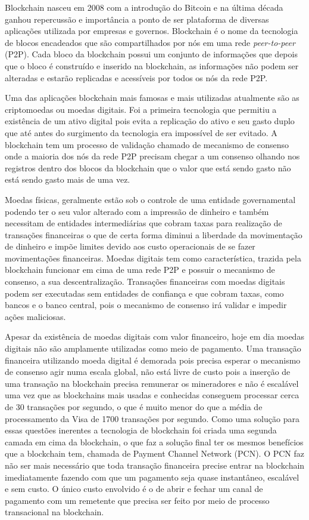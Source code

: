 \documentclass[12pt]{article}
\begin{document}
Blockchain nasceu em 2008 com a introdução do Bitcoin e na última década ganhou repercussão e importância a ponto de ser plataforma de diversas aplicações utilizada por empresas e governos. Blockchain é o nome da tecnologia de blocos encadeados que são compartilhados por nós em uma rede \emph{peer-to-peer} (P2P). Cada bloco da blockchain possui um conjunto de informações que depois que o bloco é construído e inserido na blockchain, as informações não podem ser alteradas e estarão replicadas e acessíveis por todos os nós da rede P2P.

Uma das aplicações blockchain mais famosas e mais utilizadas atualmente são as criptomoedas ou moedas digitais. Foi a primeira tecnologia que permitiu a existência de um ativo digital pois evita a replicação do ativo e seu gasto duplo que até antes do surgimento da tecnologia era impossível de ser evitado. A blockchain tem um processo de validação chamado de mecanismo de consenso onde a maioria dos nós da rede P2P precisam chegar a um consenso olhando nos registros dentro dos blocos da blockchain que o valor que está sendo gasto não está sendo gasto mais de uma vez.

Moedas físicas, geralmente estão sob o controle de uma entidade governamental podendo ter o seu valor alterado com a impressão de dinheiro e também necessitam de entidades intermediárias que cobram taxas para realização de transações financeiras o que de certa forma diminui a liberdade da movimentação de dinheiro e impõe limites devido aos custo operacionais de se fazer movimentações financeiras. Moedas digitais tem como característica, trazida pela blockchain funcionar em cima de uma rede P2P e possuir o mecanismo de consenso, a sua descentralização. Transações financeiras com moedas digitais podem ser executadas sem entidades de confiança e que cobram taxas, como bancos e o banco central, pois o mecanismo de consenso irá validar e impedir ações maliciosas.

Apesar da existência de moedas digitais com valor financeiro, hoje em dia moedas digitais não são amplamente utilizadas como meio de pagamento. Uma transação financeira utilizando moeda digital é demorada pois precisa esperar o mecanismo de consenso agir numa escala global, não está livre de custo pois a inserção de uma transação na blockchain precisa remunerar os mineradores e não é escalável uma vez que as blockchains mais usadas e conhecidas conseguem processar cerca de 30 transações por segundo, o que é muito menor do que a média de processamento da Visa de 1700 transações por segundo. Como uma solução para essas questões inerentes a tecnologia de blockchain foi criada uma segunda camada em cima da blockchain, o que faz a solução final ter os mesmos benefícios que a blockchain tem, chamada de Payment Channel Network (PCN). O PCN faz não ser mais necessário que toda transação financeira precise entrar na blockchain imediatamente fazendo com que um pagamento seja quase instantâneo, escalável e sem custo. O único custo envolvido é o de abrir e fechar um canal de pagamento com um remetente que precisa ser feito por meio de processo transacional na blockchain.
\end{document}
